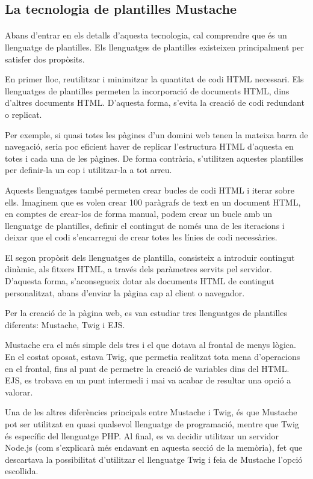\subsection{La tecnologia de plantilles Mustache}

    \paragraph{}
    Abans d'entrar en els detalls d'aquesta tecnologia, cal comprendre que és un llenguatge de plantilles. Els llenguatges de plantilles existeixen principalment per satisfer dos propòsits.

    En primer lloc, reutilitzar i minimitzar la quantitat de codi HTML necessari. Els llenguatges de plantilles permeten la incorporació de documents HTML, dins d'altres documents HTML. D'aquesta forma, s'evita la creació de codi redundant o replicat.

    Per exemple, si quasi totes les pàgines d'un domini web tenen la mateixa barra de navegació, seria poc eficient haver de replicar l'estructura HTML d'aquesta en totes i cada una de les pàgines. De forma contrària, s'utilitzen aquestes plantilles per definir-la un cop i utilitzar-la a tot arreu.

    Aquests llenguatges també permeten crear bucles de codi HTML i iterar sobre ells. Imaginem que es volen crear 100 paràgrafs de text en un document HTML, en comptes de crear-los de forma manual, podem crear un bucle amb un llenguatge de plantilles, definir el contingut de només una de les iteracions i deixar que el codi s'encarregui de crear totes les línies de codi necessàries.

    El segon propòsit dels llenguatges de plantilla, consisteix a introduir contingut dinàmic, als fitxers HTML, a través dels paràmetres servits pel servidor. D’aquesta forma, s’aconsegueix dotar als documents HTML de contingut personalitzat, abans d'enviar la pàgina cap al client o navegador.

    Per la creació de la pàgina web, es van estudiar tres llenguatges de plantilles diferents: Mustache, Twig i EJS.

    Mustache era el més simple dels tres i el que dotava al frontal de menys lògica. En el costat oposat, estava Twig, que permetia realitzat tota mena d'operacions en el frontal, fins al punt de permetre la creació de variables dins del HTML. EJS, es trobava en un punt intermedi i mai va acabar de resultar una opció a valorar.

    Una de les altres diferències principals entre Mustache i Twig, és que Mustache pot ser utilitzat en quasi qualsevol llenguatge de programació, mentre que Twig és específic del llenguatge PHP. Al final, es va decidir utilitzar un servidor Node.js (com s'explicarà més endavant en aquesta secció de la memòria), fet que descartava la possibilitat d'utilitzar el llenguatge Twig i feia de Mustache l’opció escollida.


